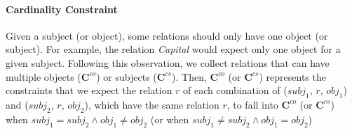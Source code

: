 \paragraph{Cardinality Constraint}
Given a subject (or object), some relations should only have one object (or subject).
For example, the relation \emph{Capital} would expect only one object for a given subject.
Following this observation, we collect relations that can have multiple objects ($\bm{C}^{co}$) or subjects ($\bm{C}^{cs}$).
Then, $\bm{C}^{co}$ (or $\bm{C}^{cs}$) represents the constraints that we expect the relation $r$ of each combination of ($subj_1$, $r$, $obj_1$) and ($subj_2$, $r$, $obj_2$), which have the same relation $r$, to fall into $\bm{C}^{co}$ (or $\bm{C}^{cs}$) when $subj_1=subj_2 \land obj_1\neq obj_2$ (or when $subj_1\neq subj_2 \land obj_1=obj_2$)


